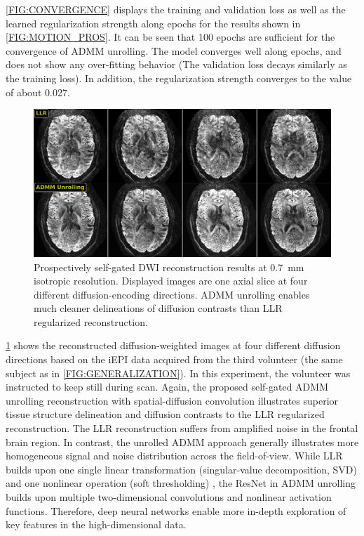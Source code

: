 \documentclass[AMA,STIX2COL,Linenumberson]{MRM}
\begin{document}
\cref{FIG:CONVERGENCE} displays the training and validation loss
as well as the learned regularization strength along epochs
for the results shown in \cref{FIG:MOTION_PROS}.
It can be seen that 100 epochs are sufficient for
the convergence of ADMM unrolling.
The model converges well along epochs,
and does not show any over-fitting behavior
(The validation loss decays similarly as the training loss).
In addition, the regularization strength converges
to the value of about 0.027.

\begin{figure}
    \includegraphics[width=\textwidth]{./figures/fig8.png}
    \caption{Prospectively self-gated DWI reconstruction results
        at 0.7~mm isotropic resolution. Displayed images are
        one axial slice at four different diffusion-encoding directions.
        ADMM unrolling enables much cleaner delineations of diffusion contrasts
        than LLR regularized reconstruction.}
    \label{FIG:SG_ZSSSL_VOL3}
\end{figure}

\cref{FIG:SG_ZSSSL_VOL3} shows the reconstructed diffusion-weighted images
at four different diffusion directions based on the iEPI data
acquired from the third volunteer
(the same subject as in \cref{FIG:GENERALIZATION}).
In this experiment, the volunteer was instructed
to keep still during scan.
Again, the proposed self-gated ADMM unrolling reconstruction
with spatial-diffusion convolution illustrates
superior tissue structure delineation and
diffusion contrasts
to the LLR regularized reconstruction.
The LLR reconstruction suffers from
amplified noise in the frontal brain region.
In contrast, the unrolled ADMM approach generally illustrates
more homogeneous signal and noise distribution
across the field-of-view.
While LLR builds upon one single linear transformation
(singular-value decomposition, SVD) and
one nonlinear operation (soft thresholding) \cite{cai_2010_svt},
the ResNet in ADMM unrolling builds upon
multiple two-dimensional convolutions and nonlinear activation functions.
Therefore, deep neural networks enable more in-depth exploration
of key features in the high-dimensional data.
\end{document}
